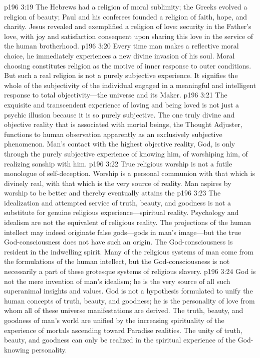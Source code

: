\vs p196 3:19 The Hebrews had a religion of moral sublimity; the Greeks evolved a religion of beauty; Paul and his conferees founded a religion of faith, hope, and charity. Jesus revealed and exemplified a religion of love: security in the Father’s love, with joy and satisfaction consequent upon sharing this love in the service of the human brotherhood.
\vs p196 3:20 Every time man makes a reflective moral choice, he immediately experiences a new divine invasion of his soul. Moral choosing constitutes religion as the motive of inner response to outer conditions. But such a real religion is not a purely subjective experience. It signifies the whole of the subjectivity of the individual engaged in a meaningful and intelligent response to total objectivity---the universe and its Maker.
\vs p196 3:21 The exquisite and transcendent experience of loving and being loved is not just a psychic illusion because it is so purely subjective. The one truly divine and objective reality that is associated with mortal beings, the Thought Adjuster, functions to human observation apparently as an exclusively subjective phenomenon. Man’s contact with the highest objective reality, God, is only through the purely subjective experience of knowing him, of worshiping him, of realizing sonship with him.
\vs p196 3:22 True religious worship is not a futile monologue of self\hyp{}deception. Worship is a personal communion with that which is divinely real, with that which is the very source of reality. Man aspires by worship to be better and thereby eventually attains the 
\vs p196 3:23 The idealization and attempted service of truth, beauty, and goodness is not a substitute for genuine religious experience---spiritual reality. Psychology and idealism are not the equivalent of religious reality. The projections of the human intellect may indeed originate false gods---gods in man’s image---but the true God\hyp{}consciousness does not have such an origin. The God\hyp{}consciousness is resident in the indwelling spirit. Many of the religious systems of man come from the formulations of the human intellect, but the God\hyp{}consciousness is not necessarily a part of these grotesque systems of religious slavery.
\vs p196 3:24 God is not the mere invention of man’s idealism; he is the very source of all such superanimal insights and values. God is not a hypothesis formulated to unify the human concepts of truth, beauty, and goodness; he is the personality of love from whom all of these universe manifestations are derived. The truth, beauty, and goodness of man’s world are unified by the increasing spirituality of the experience of mortals ascending toward Paradise realities. The unity of truth, beauty, and goodness can only be realized in the spiritual experience of the God\hyp{}knowing personality.
